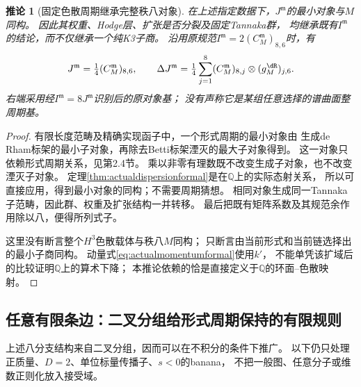 \documentclass[11pt,a4paper]{ctexart}
\theoremstyle{cnplain}\newtheorem{theorem}{定理}[section]
\newtheorem{corollary}[theorem]{推论}
\theoremstyle{definition}\newtheorem{definition}[theorem]{定义}
\theoremstyle{remark}\newtheorem{remark}[theorem]{注}
\newcommand{\Q}{\mathbb Q}\newcommand{\cC}{\mathcal C}
\begin{document}
\begin{corollary}[固定色散周期继承完整秩八对象]\label{cor:actualdispersionminimal}
在上述指定数据下，$J^{\mathfrak m}$的最小对象与$M$同构。
因此其权重、Hodge层、扩张是否分裂及固定Tannaka群，
均继承既有$I^{\mathfrak m}$的结论，而不仅继承一个纯K3子商。
沿用原规范$ I^{\mathfrak m}=2(C_M^{\mathfrak m})_{8,6}$时，有
\begin{equation}\label{eq:actualdispersioncoaction}
 J^{\mathfrak m}=\tfrac14(C_M^{\mathfrak m})_{8,6},\qquad
 \Delta J^{\mathfrak m}
   =\tfrac14\sum_{j=1}^{8}(C_M^{\mathfrak m})_{8,j}
                         \otimes(g_M^{\dR})_{j,6}.
\end{equation}
右端采用经$I^{\mathfrak m}=8J^{\mathfrak m}$识别后的原对象基；
没有声称它是某组任意选择的谱曲面整周期基。
\end{corollary}
\begin{proof}
有限长度范畴及精确实现函子中，一个形式周期的最小对象由
生成de Rham标架的最小子对象，再除去Betti标架湮灭的最大子对象得到。
这一对象只依赖形式周期关系，见\cite{brown}第2.4节。
乘以非零有理数既不改变生成子对象，也不改变湮灭子对象。
定理\ref{thm:actualdispersionformal}是在$\Q$上的实际态射关系，
所以可直接应用，得到最小对象的同构；不需要周期猜想。
相同对象生成同一Tannaka子范畴，因此群、权重及扩张结构一并转移。
最后把既有矩阵系数及其规范余作用除以八，便得所列式子。

这里没有断言整个$H^3$色散载体与秩八$M$同构；
只断言由当前形式和当前链选择出的最小子商同构。
动量式\eqref{eq:actualmomentumformal}使用$k'$，
不能单凭该扩域后的比较证明$\Q$上的算术下降；
本推论依赖的恰是直接定义于$\Q$的环面--色散映射。
\end{proof}

\subsection{任意有限条边：二叉分组给形式周期保持的有限规则}
上述八分支结构来自二叉分组，因而可以在不积分的条件下推广。
以下仍只处理正质量、$D=2$、单位标量传播子、$s<0$的banana，
不把一般图、任意分子或维数正则化放入接受域。
\end{document}
